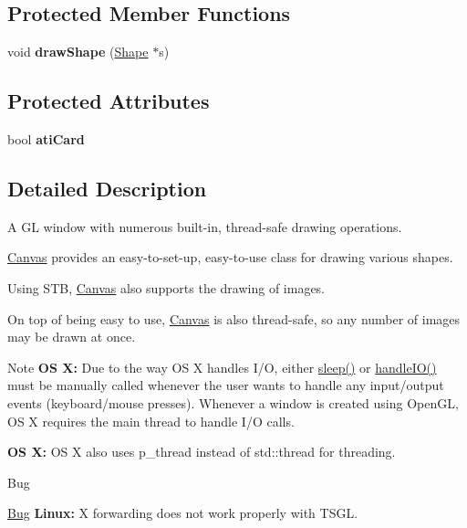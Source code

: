 \subsection*{\-Protected \-Member \-Functions}
\begin{DoxyCompactItemize}
\item 
\hypertarget{classtsgl_1_1_canvas_a560e3f64f3b2e5a7af8a8d7b92d8e660}{void {\bfseries draw\-Shape} (\hyperlink{classtsgl_1_1_shape}{\-Shape} $\ast$s)}\label{classtsgl_1_1_canvas_a560e3f64f3b2e5a7af8a8d7b92d8e660}

\end{DoxyCompactItemize}
\subsection*{\-Protected \-Attributes}
\begin{DoxyCompactItemize}
\item 
\hypertarget{classtsgl_1_1_canvas_a1558f2f09228ccaf0d46cec233a2dac7}{bool {\bfseries ati\-Card}}\label{classtsgl_1_1_canvas_a1558f2f09228ccaf0d46cec233a2dac7}

\end{DoxyCompactItemize}


\subsection{\-Detailed \-Description}
\-A \-G\-L window with numerous built-\/in, thread-\/safe drawing operations. 

\hyperlink{classtsgl_1_1_canvas}{\-Canvas} provides an easy-\/to-\/set-\/up, easy-\/to-\/use class for drawing various shapes.

\-Using \-S\-T\-B, \hyperlink{classtsgl_1_1_canvas}{\-Canvas} also supports the drawing of images.

\-On top of being easy to use, \hyperlink{classtsgl_1_1_canvas}{\-Canvas} is also thread-\/safe, so any number of images may be drawn at once. \begin{DoxyNote}{\-Note}
{\bfseries \-O\-S \-X\-:} \-Due to the way \-O\-S \-X handles \-I/\-O, either \hyperlink{classtsgl_1_1_canvas_a2604fa056d4541f918ccf447eda1f3cf}{sleep()} or \hyperlink{classtsgl_1_1_canvas_aa499851e5e4b97bb99ca4fb3d633c17e}{handle\-I\-O()} must be manually called whenever the user wants to handle any input/output events (keyboard/mouse presses). \-Whenever a window is created using \-Open\-G\-L, \-O\-S \-X requires the main thread to handle \-I/\-O calls. 

{\bfseries \-O\-S \-X\-:} \-O\-S \-X also uses p\-\_\-thread instead of std\-::thread for threading. 
\end{DoxyNote}
\begin{DoxyRefDesc}{\-Bug}
\item[\hyperlink{bug__bug000001}{\-Bug}]{\bfseries \-Linux\-:} \-X forwarding does not work properly with \-T\-S\-G\-L. \end{DoxyRefDesc}


